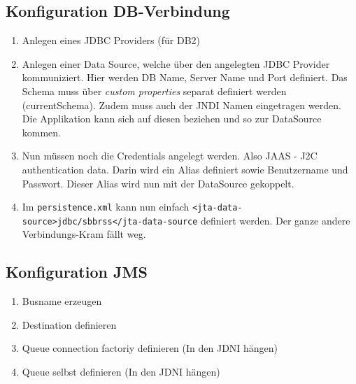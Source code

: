 \subsection{Konfiguration DB-Verbindung}
\begin{enumerate}
	\item Anlegen eines JDBC Providers (für DB2)
	\item Anlegen einer Data Source, welche über den angelegten JDBC Provider kommuniziert. Hier werden DB Name, Server Name und Port definiert. Das Schema muss über \emph{custom properties} separat definiert werden (currentSchema). Zudem muss auch der JNDI Namen eingetragen werden. Die Applikation kann sich auf diesen beziehen und so zur DataSource kommen.
	\item Nun müssen noch die Credentials angelegt werden. Also JAAS - J2C authentication data. Darin wird ein Alias definiert sowie Benutzername und Passwort. Dieser Alias wird nun mit der DataSource gekoppelt.
	\item Im \verb|persistence.xml| kann nun einfach \verb|<jta-data-source>jdbc/sbbrss</jta-data-source| definiert werden. Der ganze andere Verbindungs-Kram fällt weg.
\end{enumerate}

\subsection{Konfiguration JMS}
\begin{enumerate}
	\item Busname erzeugen
	\item Destination definieren
	\item Queue connection factoriy definieren (In den JDNI hängen)
	\item Queue selbst definieren (In den JDNI hängen)
\end{enumerate}